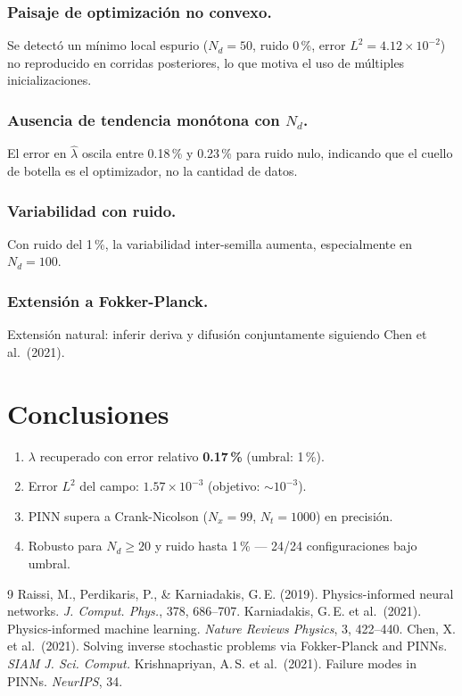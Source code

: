 \documentclass[12pt,a4paper]{article}
\newcommand{\lhat}{\hat{\lambda}}
\begin{document}
\subsubsection*{Paisaje de optimización no convexo.}
Se detectó un mínimo local espurio ($N_d=50$, ruido 0\,\%, error $L^2=4.12\times10^{-2}$)
no reproducido en corridas posteriores, lo que motiva el uso de múltiples inicializaciones.

\subsubsection*{Ausencia de tendencia monótona con $N_d$.}
El error en $\lhat$ oscila entre 0.18\,\% y 0.23\,\% para ruido nulo, indicando que el
cuello de botella es el optimizador, no la cantidad de datos.

\subsubsection*{Variabilidad con ruido.}
Con ruido del 1\,\%, la variabilidad inter-semilla aumenta, especialmente en $N_d=100$.

\subsubsection*{Extensión a Fokker-Planck.}
Extensión natural: inferir deriva y difusión conjuntamente siguiendo Chen et al.\ (2021).

\section{Conclusiones}

\begin{enumerate}
  \item $\lambda$ recuperado con error relativo \textbf{0.17\,\%} (umbral: 1\,\%).
  \item Error $L^2$ del campo: $1.57\times10^{-3}$ (objetivo: $\sim10^{-3}$).
  \item PINN supera a Crank-Nicolson ($N_x=99$, $N_t=1000$) en precisión.
  \item Robusto para $N_d\geq20$ y ruido hasta 1\,\% — 24/24 configuraciones bajo umbral.
\end{enumerate}

\begin{thebibliography}{9}
 Raissi, M., Perdikaris, P., \& Karniadakis, G.\,E. (2019).
Physics-informed neural networks. \textit{J. Comput. Phys.}, 378, 686--707.
 Karniadakis, G.\,E. et al.\ (2021). Physics-informed machine learning.
\textit{Nature Reviews Physics}, 3, 422--440.
 Chen, X. et al.\ (2021). Solving inverse stochastic problems via
Fokker-Planck and PINNs. \textit{SIAM J. Sci. Comput.}
 Krishnapriyan, A.\,S. et al.\ (2021). Failure modes in PINNs.
\textit{NeurIPS}, 34.
\end{thebibliography}
\end{document}
